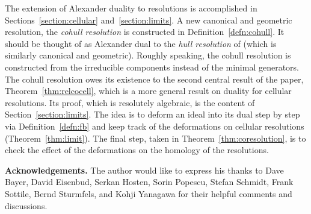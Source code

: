 \documentclass[12pt,leqno]{article}
\begin{document}
The extension of Alexander duality to resolutions is accomplished in
Sections~\ref{section:cellular} and~\ref{section:limits}.  A new
canonical and geometric resolution, the {\it cohull resolution} is
constructed in Definition~\ref{defn:cohull}.  It should be thought of as
Alexander dual to the {\it hull resolution} of \cite{BS} (which is
similarly canonical and geometric).  Roughly speaking, the cohull
resolution is constructed from the irreducible components instead of the
minimal generators.  The cohull resolution owes its existence to the
second central result of the paper, Theorem~\ref{thm:relcocell}, which is
a more general result on duality for cellular resolutions.  Its proof,
which is resolutely algebraic, is the content of
Section~\ref{section:limits}.  The idea is to deform an ideal into its
dual step by step via Definition~\ref{defn:fb} and keep track of the
deformations on cellular resolutions (Theorem~\ref{thm:limit}).  The
final step, taken in Theorem~\ref{thm:coresolution}, is to check the
effect of the deformations on the homology of the resolutions.

\vskip 2mm
\noindent
{\bf Acknowledgements.} The author would like to express his thanks to
Dave Bayer, 
David Eisenbud, 
Serkan Hosten, 
Sorin Popescu, 
Stefan Schmidt, 
Frank Sottile, 
Bernd Sturmfels, 
and Kohji Yanagawa 
for their helpful comments and discussions.
\end{document}
